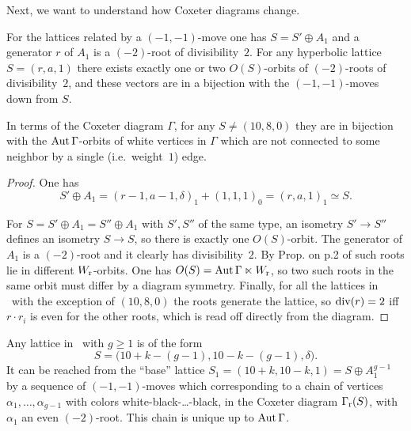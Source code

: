 \documentclass{amsart}
\begin{document}
Next, we want to understand how Coxeter diagrams change. 


\begin{lemma}\label{lem:heegner-general}
  For the lattices related by a $(-1,-1)$-move one has
  $S=S'\oplus A_1$ and a generator $r$ of $A_1$ is a $(-2)$-root of
  divisibility~$2$.
  For any hyperbolic lattice $S=(r,a,1)$ there exists exactly one or
  two $O(S)$-orbits of $(-2)$-roots of divisibility~$2$, and these
  vectors are in a bijection with the $(-1,-1)$-moves down from $S$.

  In terms of the Coxeter diagram $\Gamma$, for any $S\ne(10,8,0)$
  they are in bijection
  with the $\operatorname{Aut}\Gamma$-orbits of white vertices in $\Gamma$ which are
  not connected to some neighbor by a single (i.e.~weight~$1$) edge.
\end{lemma}
\begin{proof}
  One has
  \begin{displaymath}
  S'\oplus A_1 = (r-1,a-1,\delta)_1 + (1,1,1)_0 = (r,a,1)_1 \simeq S.    
  \end{displaymath}


  For $S=S'\oplus A_1= S''\oplus A_1$ with $S',S''$ 
  of the same type, an isometry
  $S'\to S''$ defines an isometry $S\to S$, so there is exactly one
  $O(S)$-orbit.
  The generator of $A_1$ is a $(-2)$-root and it clearly has
  divisibility~$2$. By
  Prop. on p.2 of \cite{vinberg1983two-most} such roots lie in different
  $W_{\rm r}$-orbits. One has $O(S)=\operatorname{Aut}\Gamma\ltimes W_{\rm r}$, so two
  such roots in the same orbit must differ by a diagram
  symmetry. Finally, for all the lattices in \fign\ with the exception
  of $(10,8,0)$ the roots generate the lattice, so $\operatorname{div}(r)=2$ iff
  $r\cdot r_i$ is even for the other roots, which is read off directly
  from the diagram. 
\end{proof}

\begin{corollary}\label{cor:reach-by-moves}
  Any lattice in \fign\ with $g\ge1$ is of the form
  $$S =\big(10+k-(g-1),10-k-(g-1),\delta\big).$$
  It can be reached from the ``base'' lattice
  $S_1 = (10+k,10-k,1) = S\oplus A_1^{g-1}$ by a sequence of
  $(-1,-1)$-moves which corresponding to a chain of vertices
  $\alpha_1,\dotsc,\alpha_{g-1}$ with colors white-black-\dots-black,
  in the Coxeter diagram $\Gamma_{\rm r}(S)$, with $\alpha_1$ an even $(-2)$-root.
  This chain is unique up to $\operatorname{Aut}\Gamma$.
\end{corollary}
\end{document}

